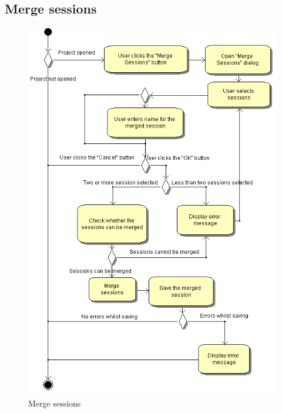 \subsection{Merge sessions}
\begin{figure}[htb]
 \centering
 \includegraphics[height=0.7\textheight]{images/Activities/merge_sessions.png}
 \caption{Merge sessions}
 \label{ac_fg:merge_sessions}
\end{figure}

\clearpage
